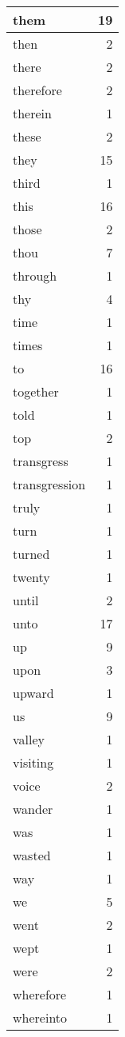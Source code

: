 \begin{center}
\begin{longtable}{l|r}
them & 19 \\ \hline
then & 2 \\ \hline
there & 2 \\ \hline
therefore & 2 \\ \hline
therein & 1 \\ \hline
these & 2 \\ \hline
they & 15 \\ \hline
third & 1 \\ \hline
this & 16 \\ \hline
those & 2 \\ \hline
thou & 7 \\ \hline
through & 1 \\ \hline
thy & 4 \\ \hline
time & 1 \\ \hline
times & 1 \\ \hline
to & 16 \\ \hline
together & 1 \\ \hline
told & 1 \\ \hline
top & 2 \\ \hline
transgress & 1 \\ \hline
transgression & 1 \\ \hline
truly & 1 \\ \hline
turn & 1 \\ \hline
turned & 1 \\ \hline
twenty & 1 \\ \hline
until & 2 \\ \hline
unto & 17 \\ \hline
up & 9 \\ \hline
upon & 3 \\ \hline
upward & 1 \\ \hline
us & 9 \\ \hline
valley & 1 \\ \hline
visiting & 1 \\ \hline
voice & 2 \\ \hline
wander & 1 \\ \hline
was & 1 \\ \hline
wasted & 1 \\ \hline
way & 1 \\ \hline
we & 5 \\ \hline
went & 2 \\ \hline
wept & 1 \\ \hline
were & 2 \\ \hline
wherefore & 1 \\ \hline
whereinto & 1 \\ \hline

\end{longtable}
\end{center}
